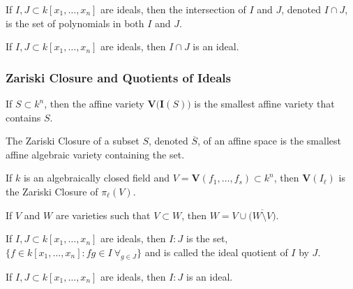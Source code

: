 \documentclass[crop=false,class=article,oneside]{standalone}
\begin{document}
            \begin{definition}
                If $I,J\subset k[x_1,\hdots ,x_n]$ are ideals,
                then the intersection of $I$ and $J$,
                denoted $I\cap J$, is the set of polynomials
                in both $I$ and $J$.
            \end{definition}
            \begin{theorem}
                If $I,J\subset k[x_1,\hdots ,x_n]$ are ideals,
                then $I\cap J$ is an ideal.
            \end{theorem}
        \subsubsection{Zariski Closure and Quotients of Ideals}
            \begin{theorem}
                If $S\subset k^n$, then the affine variety
                $\mathbf{V}\big(\textbf{I}(S)\big)$ is
                the smallest affine variety that contains $S$.
            \end{theorem}
            \begin{definition}
                The Zariski Closure of a subset $S$,
                denoted $\overline{S}$, of an affine space
                is the smallest affine algebraic variety
                containing the set. 
            \end{definition}
            \begin{theorem}
                If $k$ is an algebraically closed field
                and $V=\mathbf{V}(f_1,\hdots, f_s)\subset k^n$,
                then $\mathbf{V}(I_{\ell})$ is the Zariski Closure
                of $\pi_{\ell}(V)$.
            \end{theorem}
            \begin{theorem}
                If $V$ and $W$ are varieties such that
                $V\subset W$,
                then $W=V\cup \overline{\big(W\setminus V\big)}$.
            \end{theorem}
            \begin{definition}
                If $I,J\subset k[x_1,\hdots ,x_n]$ are ideals,
                then $I:J$ is the set,
                $\{f\in k[x_1,\hdots ,x_n]: fg \in I\ \forall_{g\in J}\}$
                and is called the ideal quotient of $I$ by $J$.
            \end{definition}
            \begin{theorem}
                If $I,J\subset k[x_1,\hdots ,x_n]$ are ideals,
                then $I:J$ is an ideal.
            \end{theorem}
\end{document}
